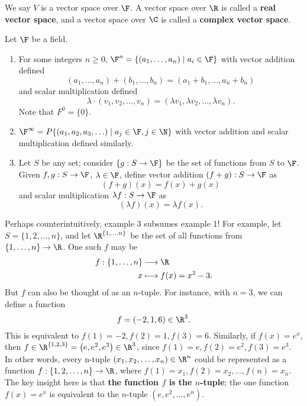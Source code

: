 \documentclass[math0540-lecture-notes.tex]{subfiles}
\begin{document}
\begin{example}
  We say $V$ is a vector space over $\F$. A vector space over $\R$ is called a \textbf{real vector
  space}, and a vector space over $\C$ is called a \textbf{complex vector space}.
\end{example}

\begin{example}
  Let $\F$ be a field.
  \begin{enumerate}
    \item For some integers $n\ge 0$, $\F^{n}=\{\left( a_1,\ldots,a_n \right) \mid a_i\in \F \} $
      with vector addition defined \[
        (a_1,\ldots,a_n)+(b_1,\ldots,b_n) = (a_1+b_1,\ldots,a_n+b_n)
      \] and scalar multiplication defined \[
      \lambda\cdot (v_1,v_2,\ldots,v_n) = (\lambda v_1,\lambda v_2,\ldots,\lambda v_n)
      .\] 
      Note that $ F^{0}=\{ 0 \}$.
    \item $\F^{\infty}=P\{ \left( a_1,a_2,a_3,\ldots \right)\mid a_j\in \F, j\in \N  \}$ with vector
      addition and scalar multiplication defined similarly.
    \item Let $S$ be any set; consider $\{ g:S\to\F \}$ be the set of functions from $S$ to $\F$.
      Given $f,g:S\to \F$, $\lambda\in \F$, define vector addition $(f+g):S\to\F$ as \[
        (f+g)(x) = f(x) + g(x)
      \] and scalar multiplication $ \lambda f:S\to\F$ as \[
      (\lambda f)(x) = \lambda f(x)
      .\] 
  \end{enumerate}
\end{example}

Perhaps counterintuitively, example 3 subsumes example 1! For example, let $S=\{1,2,\ldots,n\}$, and
let $\R^{\{ 1,\ldots,n \}}$ be the set of all functions from $\{ 1,\ldots,n \}\to \R$. One such $f$
may be \begin{align*}
  f: \{ 1,\ldots,n \} &\longrightarrow \R \\
  x &\longmapsto f(x) = x^2-3
.\end{align*} But $f$ can also be thought of as an $n$-tuple. For instance, with $n=3$, we can
define a function \[
  f = (-2,1,6)\in \R^3
.\] This is equivalent to $f(1)=-2,f(2)=1,f(3)=6$. Similarly, if $f(x) =e^{x}$, then $f\in \R^{\{
1,2,3 \}}=\left( e,e^2,e^3 \right) \in \R^3$, since $f(1)=e, f(2)=e^2,f(3)=e^3$. \\

In other words, every n-tuple $\left( x_1,x_2,\ldots,x_n \right) \in \R^n $ could be represented as a
function $f:\{ 1,2,\ldots,n \}\to\R$, where $f(1)=x_1,f(2)=x_2,\ldots,f(n)=x_n$. The key insight here is that
\textbf{the function $f$ is the $n$-tuple}; the one function $f(x)=e^{x}$ is equivalent to the
$n$-tuple $\left( e,e^2,\ldots,e^{n} \right) $.\\
\end{document}
